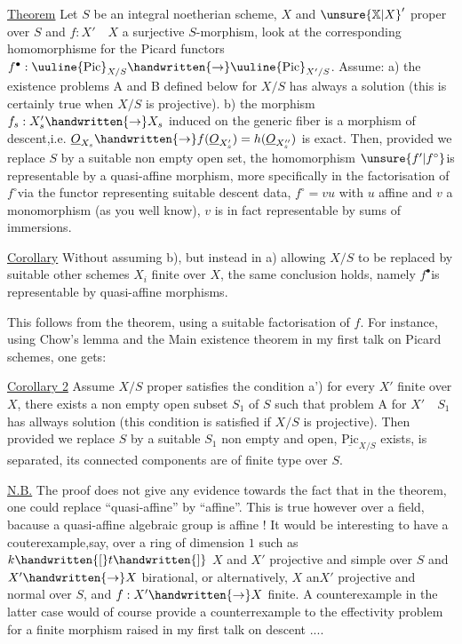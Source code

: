 \uline{Theorem} Let $S$ be an integral noetherian scheme, $X$ and $\unsure{\mathbb{X}|X}'$ proper over $S$ and $f:X'\quad X$ a surjective $S$-morphism, look at the corresponding homomorphisme for the Picard functors $f^{\bullet}:\text{\uuline{Pic}}_{X/S}\handwritten{\to}\text{\uuline{Pic}}_{X'/S}$. Assume: a) the existence problems A and B defined below for $X/S$ has always a solution (this is certainly true when $X/S$ is projective). b) the morphism $f_{s}:X'_{s}\handwritten{\to}X_{s}$ induced on the generic fiber is a morphism of descent,i.e. $\underline{O}_{X_{s}}\handwritten{\to}f(\underline{O}_{X'_{s}})=h(\underline{O}_{X''_{s}})$ is exact. Then, provided we replace $S$ by a suitable non empty open set, the homomorphism $\unsure{f'|f^{\circ}}$is representable by a quasi-affine morphism, more specifically \unsure{:|;} in the factorisation of $f^{\circ}$via the functor representing suitable descent data, $f^{\circ}=vu$ with $u$ affine and $v$ a monomorphism (as you well know), $v$ is in fact representable by   sums of immersions.

\uline{Corollary} Without assuming b), but instead in a) allowing $X/S$ to be replaced by suitable other schemes $X_{i}$ finite over $X$, the same conclusion  holds, namely $f^{\bullet}$is representable by quasi-affine morphisms.

This follows from the theorem, using a suitable factorisation of $f$. For instance, using Chow's lemma and the Main existence theorem in my first talk on Picard schemes, one gets:

\uline{Corollary 2} Assume $X/S$ proper satisfies the condition a') for every $X'$ finite over $X$, there exists a non empty open subset $S_{1}$ of $S$ such that problem A for $X'\quad S_{1}$ has allways solution  (this condition is satisfied if $X/S$ is projective). Then provided we replace $S$ by a suitable $S_{1}$ non empty and open, $\underline{\mathrm{Pic}}_{X/S}$ exists, is separated, its connected components are of finite type over $S$.

\uline{N.B.} The proof does not give any evidence towards the fact that in
the theorem, one could replace ``quasi-affine'' by ``affine''. This is true however over a field, bacause a quasi-affine algebraic group is affine ! It would be interesting to have a couterexample,say, over a ring of dimension $1$ such as $k\handwritten{[}t\handwritten{]}$\handwritten{,} $X$ and $X'$ projective and simple over $S$ and $X'\handwritten{\to}X$ birational, or alternatively, $X$ an$X'$ projective and normal over $S$, and $f:X'\handwritten{\to}X$ finite. A counterexample in the latter case would of course provide a counterrexample to the effectivity problem for a finite morphism raised in my first talk on descent ....

